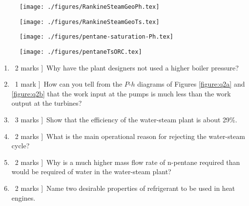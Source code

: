 \documentclass[a4paper,12pt,fleqn]{article}
\begin{document}
\begin{figure*}[h]
    \centering
    \begin{subfigure}[t]{0.5\textwidth}
        \centering
        \texttt{[image: ./figures/RankineSteamGeoPh.tex]}
        \caption{}
    \end{subfigure}%
    \centering
    \begin{subfigure}[t]{0.5\textwidth}
        \centering
        \texttt{[image: ./figures/RankineSteamGeoTs.tex]}
        \caption{}
    \end{subfigure}
    \centering
    \caption{$P$-$h$ and $T$-$s$ diagrams for a proposed water-steam Rankine cycle for a geothermal plant. Lines of constant dryness fraction are shown in green.} 
    \label{figure:q2a}
\end{figure*}

\begin{figure*}[h]
    \centering
    \begin{subfigure}[t]{0.5\textwidth}
        \centering
        \texttt{[image: ./figures/pentane-saturation-Ph.tex]}
        \caption{}
    \end{subfigure}%
    \centering
    \begin{subfigure}[t]{0.5\textwidth}
        \centering
        \texttt{[image: ./figures/pentaneTsORC.tex]}
        \caption{}
    \end{subfigure}
    \centering
    \caption{$P$-$h$ and $T$-$s$ diagrams for a proposed Organic Rankine cycle for a geothermal plant.}
    \label{figure:q2b}
\end{figure*}


\begin{enumerate}[label=\alph*)]
\item \lbrack\ 2 marks ]\ Why have the plant designers not used a higher boiler pressure?
\item \lbrack\ 1 mark ]\ How can you tell from the $P$-$h$ diagrams of Figures \ref{figure:q2a} and \ref{figure:q2b} that the work input at the pumps is much less than the work output at the turbines?
\item \lbrack\ 3 marks ]\ Show that the efficiency of the water-steam plant is about 29\%.
\item \lbrack\ 2 marks ]\ What is the main operational reason for rejecting the water-steam cycle?
\item \lbrack\ 2 marks ]\ Why is a much higher mass flow rate of n-pentane required than would be required of water in the water-steam plant?
\item \lbrack\ 2 marks ]\  Name two desirable properties of refrigerant to be used in heat engines.

\end{enumerate}
\end{document}
